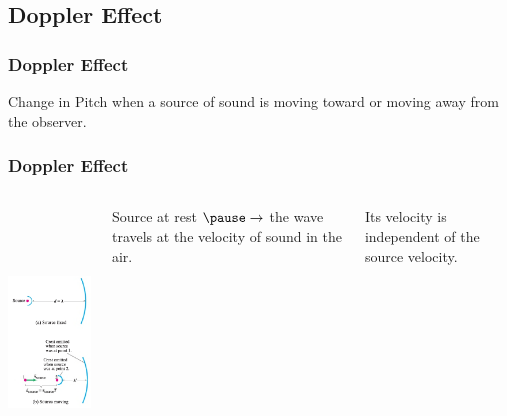 \documentclass[]{beamer}
\begin{document}




\subsection{Doppler Effect}

\begin{frame}
\frametitle{Doppler Effect}

Change in Pitch when a source of sound is moving toward or moving away from the observer. 




  \end{frame}





\begin{frame}
\frametitle{Doppler Effect}




\begin{columns}[c]
  \column{2in}  %

  \begin{center}
    \includegraphics[height=2.8in]{images4/doppler1_b.jpg}
  \end{center} 
  \column{2in}

  Source at rest $\pause\rightarrow$ the wave travels at the velocity of sound in the air.
  \pause
  
  \vspace{3mm}

  Its velocity is independent of the source velocity.





  \end{columns}



  \end{frame}
\end{document}
